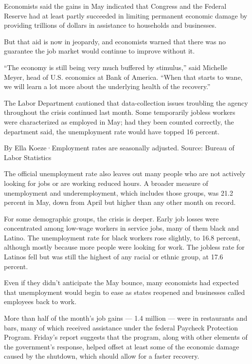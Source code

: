Economists said the gains in May indicated that Congress and the Federal
Reserve had at least partly succeeded in limiting permanent economic
damage by providing trillions of dollars in assistance to households and
businesses.

But that aid is now in jeopardy, and economists warned that there was no
guarantee the job market would continue to improve without it.

``The economy is still being very much buffered by stimulus,'' said
Michelle Meyer, head of U.S. economics at Bank of America. ``When that
starts to wane, we will learn a lot more about the underlying health of
the recovery.''

The Labor Department cautioned that data-collection issues troubling the
agency throughout the crisis continued last month. Some temporarily
jobless workers were characterized as employed in May; had they been
counted correctly, the department said, the unemployment rate would have
topped 16 percent.

By Ella Koeze·Employment rates are seasonally adjusted. \textbar{}
Source: Bureau of Labor Statistics

The official unemployment rate also leaves out many people who are not
actively looking for jobs or are working reduced hours. A broader
measure of unemployment and underemployment, which includes those
groups, was 21.2 percent in May, down from April but higher than any
other month on record.

For some demographic groups, the crisis is deeper. Early job losses were
concentrated among low-wage workers in service jobs, many of them black
and Latino. The unemployment rate for black workers rose slightly, to
16.8 percent, although mostly because more people were looking for work.
The jobless rate for Latinos fell but was still the highest of any
racial or ethnic group, at 17.6 percent.

Even if they didn't anticipate the May bounce, many economists had
expected that unemployment would begin to ease as states reopened and
businesses called employees back to work.

More than half of the month's job gains --- 1.4 million --- were in
restaurants and bars, many of which received assistance under the
federal Paycheck Protection Program. Friday's report suggests that the
program, along with other elements of the government's response, helped
offset at least some of the economic damage caused by the shutdown,
which should allow for a faster recovery.

